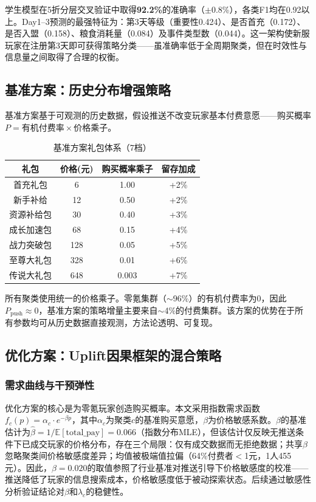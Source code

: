 学生模型在5折分层交叉验证中取得\textbf{92.2\%}的准确率（$\pm$0.8\%），各类F1均在0.92以上。Day1--3预测的最强特征为：第3天等级（重要性0.424）、是否首充（0.172）、是否入盟（0.158）、粮食消耗量（0.084）及事件类型数（0.044）。这一架构使新服玩家在注册第3天即可获得策略分类——虽准确率低于全周期聚类，但在时效性与信息量之间取得了合理的权衡。

\subsection{基准方案：历史分布增强策略}

基准方案基于可观测的历史数据，假设推送不改变玩家基本付费意愿——购买概率$P = \text{有机付费率} \times \text{价格乘子}$。

\begin{table}[H]
\centering
\caption{基准方案礼包体系（7档）}
\label{tab:conservative_packs}
\begin{tabular}{c|c|c|c}
\toprule
\textbf{礼包} & \textbf{价格(元)} & \textbf{购买概率乘子} & \textbf{留存加成} \\
\midrule
首充礼包 & 6 & 1.00 & +2\% \\
新手补给 & 12 & 0.50 & +2\% \\
资源补给包 & 30 & 0.40 & +3\% \\
成长加速包 & 68 & 0.15 & +4\% \\
战力突破包 & 128 & 0.05 & +5\% \\
至尊大礼包 & 328 & 0.01 & +6\% \\
传说大礼包 & 648 & 0.003 & +7\% \\
\bottomrule
\end{tabular}
\end{table}

所有聚类使用统一的价格乘子。零氪集群（$\sim$96\%）的有机付费率为0，因此$P_{\text{push}} \approx 0$，基准方案的策略增量主要来自$\sim$4\%的付费集群。该方案的优势在于所有参数均可从历史数据直接观测，方法论透明、可复现。

\subsection{优化方案：Uplift因果框架的混合策略}

\subsubsection{需求曲线与干预弹性}

优化方案的核心是为零氪玩家创造购买概率。本文采用指数需求函数$f_c(p) = \alpha_c \cdot e^{-\beta p}$，其中$\alpha_c$为聚类$c$的基准购买意愿，$\beta$为价格敏感系数。$\beta$的基准估计为$\hat{\beta} = 1/\mathbb{E}[\text{total\_pay}]=0.066$（指数分布MLE），但该估计仅反映无推送条件下已成交玩家的价格分布，存在三个局限：仅有成交数据而无拒绝数据；共享$\beta$忽略聚类间价格敏感度差异；均值被极端值拉偏（64\%付费者$<$1元，1人455元）。因此，$\beta=0.020$的取值参照了行业基准\cite{wei2024}对推送引导下价格敏感度的校准——推送降低了玩家的信息搜索成本，价格敏感度低于被动探索状态。后续通过敏感性分析验证结论对$\beta$和$\lambda_c$的稳健性。

